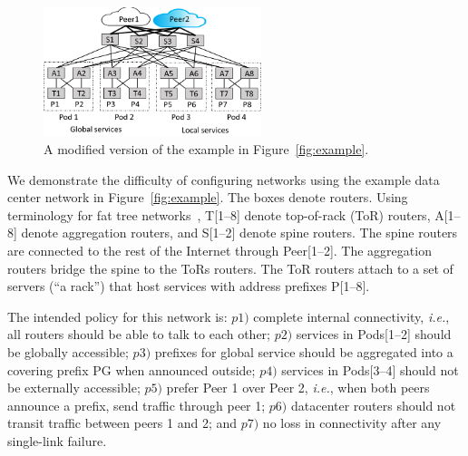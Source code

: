 \documentclass{sig-alternate-10pt}
\newcommand{\todo}[1]{\textcolor{red}{[TODO: #1]}}
\newcommand{\IE}{\emph{i.e.}}
\begin{document}
\begin{figure}[t!]
  \centering
  \includegraphics[width=2.5in]{figures/example2}
  \caption{A modified version of the example in Figure~\ref{fig:example}.}
  \label{fig:example2}
  \vspace{-1em}
\end{figure}

We demonstrate the difficulty of configuring networks using the example data center network in Figure~\ref{fig:example}. The boxes denote routers. Using terminology for fat tree networks~\cite{fattree}, T[1--8] denote top-of-rack (ToR) routers, A[1--8] denote aggregation routers, and S[1--2] denote spine routers. The spine routers are connected to the
rest of the Internet through Peer[1--2]. The aggregation routers
bridge the spine to the ToRs routers. The ToR routers attach to a set of servers (``a rack'') that host services with address prefixes P[1--8].



The intended policy for this network is:
$p1)$ complete internal connectivity, \IE, all routers should be able to talk to each other;
$p2)$ services in Pods[1--2] should be globally accessible;
$p3)$ prefixes for global service should be aggregated into a covering prefix PG when announced outside;
$p4)$ services in Pods[3--4] should not be externally accessible;
$p5)$ prefer Peer 1 over Peer 2, \IE, when both peers announce a prefix, send traffic through peer 1;
$p6)$ datacenter routers should not transit traffic between peers 1 and 2; and
$p7)$ no loss in connectivity after any single-link failure.
\end{document}
